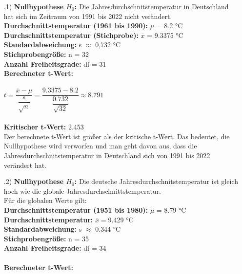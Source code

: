 \documentclass[12pt]{scrartcl}
\begin{document}
\exercise{}
\begin{itemize}
    \item[\theenumi.1)] \textbf{Nullhypothese $H_0$:} Die Jahresdurchschnitstemperatur in Deutschland hat sich 
                                                      im Zeitraum von 1991 bis 2022 nicht verändert.\\
                        \textbf{Durchschnittstemperatur (1961 bis 1990):} $\mu$ = 8.2 °C\\
                        \textbf{Durchschnittstemperatur (Stichprobe):} $\overline{x}$ = 9.3375 °C\\
                        \textbf{Standardabweichung:} s $\approx$ 0,732 °C\\
                        \textbf{Stichprobengröße:} n = 32\\
                        \textbf{Anzahl Freiheitsgrade:} df = 31\\
                        \textbf{Berechneter t-Wert:} \\\\
                        $t = \dfrac{\overline{x}-\mu}{\dfrac{s}{\sqrt{n}}} = \dfrac{9.3375-8.2}{\dfrac{0.732}{\sqrt{32}}} \approx 8.791$\\\\
                        \textbf{Kritischer t-Wert:} 2.453\\
                        Der berechnete t-Wert ist größer als der kritische t-Wert. Das bedeutet, die Nullhypothese wird verworfen und man geht davon aus,
                        dass die Jahresdurchschnitstemperatur in Deutschland sich von 1991 bis 2022 verändert hat.
                        
	\item[\theenumi.2)] \textbf{Nullhypothese $H_0$:} Die deutsche Jahresdurchschnitstemperatur ist gleich hoch wie die globale Jahresdurchschnittstemperatur.\\
	Für die globalen Werte gilt:\\
	\textbf{Durchschnittstemperatur (1951 bis 1980):} $\mu$ = 8.79 °C\\
						\textbf{Durchschnittstemperatur:} $\overline{x} = $9.429 °C\\
                        \textbf{Standardabweichung:} s $\approx$ 0.344 °C \\
                        \textbf{Stichprobengröße:} n = 35\\
                        \textbf{Anzahl Freiheitsgrade:} df = 34 \\
                        \\
\textbf{Berechneter t-Wert:}


\end{itemize}
\end{document}

